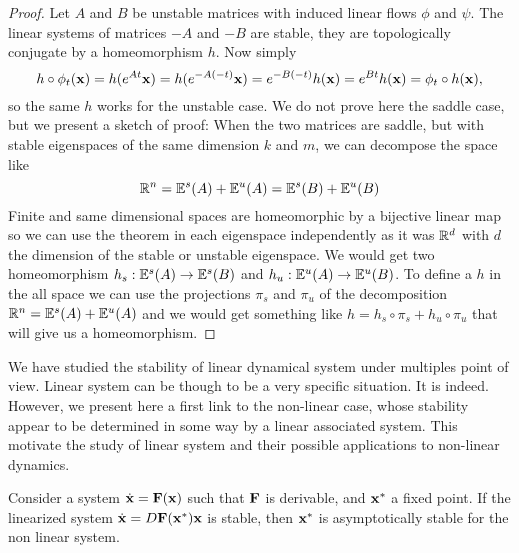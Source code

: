 \begin{proof}
    Let $A$ and $B$ be unstable matrices with induced linear flows $\phi$ and $\psi$. The linear systems of matrices $-A$ and $-B$ are stable, they are topologically conjugate by a homeomorphism $h$. Now simply $$h\circ\phi_t(\mathbf{x}) 
    = h(e^{At}\mathbf{x}) 
    = h(e^{-A(-t)}\mathbf{x}) 
    = e^{-B(-t)}h(\mathbf{x})
    = e^{Bt}h(\mathbf{x})
    = \phi_t\circ h(\mathbf{x})
    ,$$
    so the same $h$ works for the unstable case. We do not prove here the saddle case, but we present a sketch of proof:
    When the two matrices are saddle, but with stable eigenspaces of the same dimension $k$ and $m$, we can decompose the space like
    $$\mathbb{R}^n
    = \mathbb{E}^s(A)+\mathbb{E}^u(A) 
    =\mathbb{E}^s(B)+\mathbb{E}^u(B)$$
    Finite and same dimensional spaces are homeomorphic by a bijective linear map so we can use the theorem in each eigenspace independently as it was $\mathbb{R}^d$ with $d$ the dimension of the stable or unstable eigenspace. We would get two homeomorphism $h_s:\mathbb{E}^s(A)\to\mathbb{E}^s(B)$ and $h_u:\mathbb{E}^u(A)\to\mathbb{E}^u(B)$. To define a $h$ in the all space we can use the projections $\pi_s$ and $\pi_u$ of the decomposition $\mathbb{R}^n
    = \mathbb{E}^s(A)+\mathbb{E}^u(A)$  and we would get something like $h = h_s\circ\pi_s + h_u\circ\pi_u$ that will give us a homeomorphism.
\end{proof}
We have studied the stability of linear dynamical system under multiples point of view. Linear system can be though to be a very specific situation. It is indeed. However, we present here a first link to the non-linear case, whose stability appear to be determined in some way by a linear associated system. This motivate the study of linear system and their possible applications to non-linear dynamics.
\begin{theoreme} \label{th:linearisation}
    Consider a system $\dot{\mathbf{x}}=\mathbf{F}(\mathbf{x})$ such that $\mathbf{F}$ is derivable, and $\mathbf{x}^*$ a fixed point. If the linearized system $\dot{\mathbf{x}}=D\mathbf{F}(\mathbf{x}^*)\mathbf{x}$ is stable, then $\mathbf{x}^*$ is asymptotically stable for the non linear system.
\end{theoreme}
